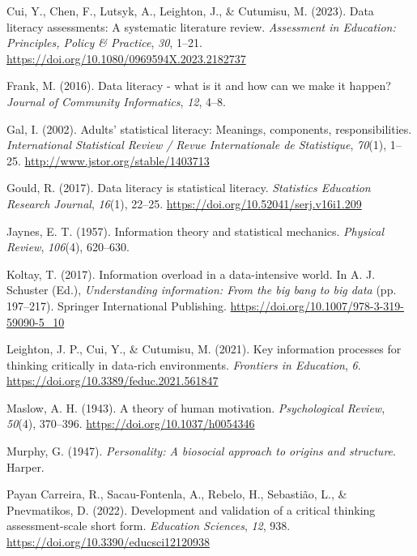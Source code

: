 \documentclass[
  12pt,
  a4paper,
  twoside]{article}
\newlength{\cslhangindent}
\newenvironment{CSLReferences}[2] %
 {\begin{list}{}{%
  \setlength{\itemindent}{0pt}
  \setlength{\leftmargin}{0pt}
  \setlength{\parsep}{0pt}
  \ifodd #1
   \setlength{\leftmargin}{\cslhangindent}
   \setlength{\itemindent}{-1\cslhangindent}
  \fi
  \setlength{\itemsep}{#2\baselineskip}}}
 {\end{list}}
\begin{document}
\begin{CSLReferences}{1}{0}
Cui, Y., Chen, F., Lutsyk, A., Leighton, J., \& Cutumisu, M. (2023). Data literacy assessments: A systematic literature review. \emph{Assessment in Education: Principles, Policy \& Practice}, \emph{30}, 1--21. \url{https://doi.org/10.1080/0969594X.2023.2182737}

Frank, M. (2016). Data literacy - what is it and how can we make it happen? \emph{Journal of Community Informatics}, \emph{12}, 4--8.

Gal, I. (2002). Adults' statistical literacy: Meanings, components, responsibilities. \emph{International Statistical Review / Revue Internationale de Statistique}, \emph{70}(1), 1--25. \url{http://www.jstor.org/stable/1403713}

Gould, R. (2017). Data literacy is statistical literacy. \emph{Statistics Education Research Journal}, \emph{16}(1), 22--25. \url{https://doi.org/10.52041/serj.v16i1.209}

Jaynes, E. T. (1957). Information theory and statistical mechanics. \emph{Physical Review}, \emph{106}(4), 620--630.

Koltay, T. (2017). Information overload in a data-intensive world. In A. J. Schuster (Ed.), \emph{Understanding information: From the big bang to big data} (pp. 197--217). Springer International Publishing. \url{https://doi.org/10.1007/978-3-319-59090-5_10}

Leighton, J. P., Cui, Y., \& Cutumisu, M. (2021). Key information processes for thinking critically in data-rich environments. \emph{Frontiers in Education}, \emph{6}. \url{https://doi.org/10.3389/feduc.2021.561847}

Maslow, A. H. (1943). A theory of human motivation. \emph{Psychological Review}, \emph{50}(4), 370--396. \url{https://doi.org/10.1037/h0054346}

Murphy, G. (1947). \emph{Personality: A biosocial approach to origins and structure}. Harper.

Payan Carreira, R., Sacau-Fontenla, A., Rebelo, H., Sebastião, L., \& Pnevmatikos, D. (2022). Development and validation of a critical thinking assessment-scale short form. \emph{Education Sciences}, \emph{12}, 938. \url{https://doi.org/10.3390/educsci12120938}


\end{CSLReferences}
\end{document}
